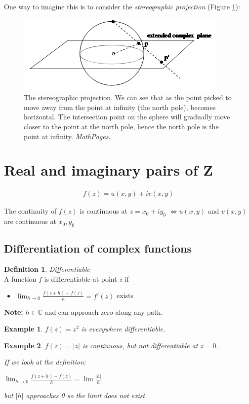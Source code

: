 \documentclass{article}
\newtheorem{ex}{Example}
\theoremstyle{definition}
\newtheorem{definition}{Definition}[section]
\newcommand{\Def}[2]{
\begin{shaded*}
\begin{definition}{\textit{#1}}\\#2\end{definition}
\end{shaded*}
}
\def\C{\mathbb{C}}
\begin{document}
One way to imagine this is to consider the \textit{stereographic projection} (Figure \ref{fig:stereographic}):
\begin{figure}[H]
	\centering
	\includegraphics[width=0.5\linewidth]{stereographic_projection}
	\caption{The stereographic projection. We can see that as the point picked to move away from the point at infinity (the north pole), becomes horizontal. The intersection point on the sphere will gradually move closer to the point at the north pole, hence the north pole is the point at infinity. \textit{MathPages}.}
	\label{fig:stereographic}
\end{figure}


\section{Real and imaginary pairs of Z}

\begin{align}
	f(z) = u(x,y)+iv(x,y)
\end{align}

The continuity of $f(z)$ is continuous at $z = x_0 + iy_0$ $\iff u(x,y)$ and $v(x,y)$ are continuous at $x_0, y_0$ 

\subsection{Differentiation of complex functions}

\Def{Differentiable}{A function $f$ is differentiable at point $z$ if 
\begin{itemize}
	\item $\lim_{h\to0} \frac{f(z+h) - f(z)}{h} = f'(z)$ exists
\end{itemize}

\textbf{Note:} $h \in \C$ and can approach zero along any path. 
}


\begin{ex}
$f(z) = z^2$ is everywhere differentiable. 
\end{ex}

\begin{ex}
	$f(z) = |z|$ is continuous, but not differentiable at $z = 0$. 
	
	If we look at the definition:
	
	$\lim_{h\to0} \frac{f(z+h) - f(z)}{h} = \lim \frac{|h|}{h}$
	
	but $|h|$ approaches 0 so the limit does not exist.
\end{ex}
\end{document}
